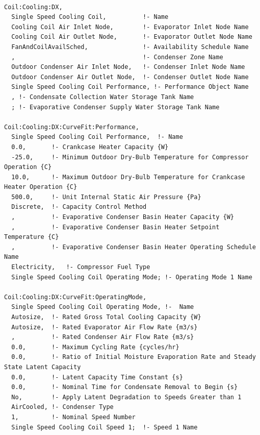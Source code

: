 \begin{lstlisting}

Coil:Cooling:DX,
  Single Speed Cooling Coil,          !- Name
  Cooling Coil Air Inlet Node,        !- Evaporator Inlet Node Name
  Cooling Coil Air Outlet Node,       !- Evaporator Outlet Node Name
  FanAndCoilAvailSched,               !- Availability Schedule Name
  ,                                   !- Condenser Zone Name
  Outdoor Condenser Air Inlet Node,   !- Condenser Inlet Node Name
  Outdoor Condenser Air Outlet Node,  !- Condenser Outlet Node Name
  Single Speed Cooling Coil Performance, !- Performance Object Name
  , !- Condensate Collection Water Storage Tank Name
  ; !- Evaporative Condenser Supply Water Storage Tank Name

Coil:Cooling:DX:CurveFit:Performance,
  Single Speed Cooling Coil Performance,  !- Name
  0.0,       !- Crankcase Heater Capacity {W}
  -25.0,     !- Minimum Outdoor Dry-Bulb Temperature for Compressor Operation {C}
  10.0,      !- Maximum Outdoor Dry-Bulb Temperature for Crankcase Heater Operation {C}
  500.0,     !- Unit Internal Static Air Pressure {Pa}
  Discrete,  !- Capacity Control Method
  ,          !- Evaporative Condenser Basin Heater Capacity {W}
  ,          !- Evaporative Condenser Basin Heater Setpoint Temperature {C}
  ,          !- Evaporative Condenser Basin Heater Operating Schedule Name
  Electricity,   !- Compressor Fuel Type
  Single Speed Cooling Coil Operating Mode; !- Operating Mode 1 Name

Coil:Cooling:DX:CurveFit:OperatingMode,
  Single Speed Cooling Coil Operating Mode, !-  Name
  Autosize,  !- Rated Gross Total Cooling Capacity {W}
  Autosize,  !- Rated Evaporator Air Flow Rate {m3/s}
  ,          !- Rated Condenser Air Flow Rate {m3/s}
  0.0,       !- Maximum Cycling Rate {cycles/hr}
  0.0,       !- Ratio of Initial Moisture Evaporation Rate and Steady State Latent Capacity
  0.0,       !- Latent Capacity Time Constant {s}
  0.0,       !- Nominal Time for Condensate Removal to Begin {s}
  No,        !- Apply Latent Degradation to Speeds Greater than 1
  AirCooled, !- Condenser Type
  1,         !- Nominal Speed Number
  Single Speed Cooling Coil Speed 1;  !- Speed 1 Name


\end{lstlisting}

